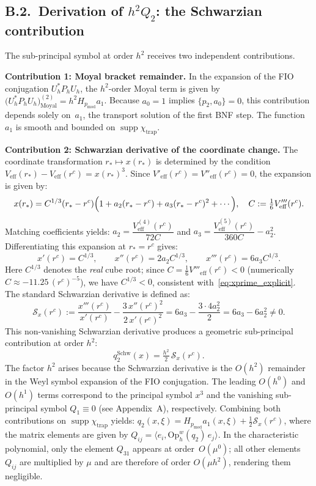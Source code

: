 \documentclass[12pt,a4paper]{amsart}
\theoremstyle{remark}
\begin{document}
\subsection*{B.2.~Derivation of $h^2 Q_2$: the Schwarzian contribution}

The sub-principal symbol at order $h^2$ receives two independent contributions.

\textbf{Contribution 1: Moyal bracket remainder.}
In the expansion of the FIO conjugation $U_h^* P_h U_h$, the $h^2$-order Moyal
term is given by $\bigl(U_h^* P_h U_h\bigr)^{(2)}_{\mathrm{Moyal}} = h^2 H_{p_{\mathrm{mod}}} a_1$.
Because $a_0 = 1$ implies $\{p_2, a_0\} = 0$, this contribution depends solely on~$a_1$, the
transport solution of the first BNF step. The function $a_1$ is smooth and bounded on
$\operatorname{supp}\chi_{\mathrm{trap}}$.

\textbf{Contribution 2: Schwarzian derivative of the coordinate change.}
The coordinate transformation $r_* \mapsto x(r_*)$ is determined by the condition
$V_{\mathrm{eff}}(r_*) - V_{\mathrm{eff}}(r^c) = x(r_*)^3$. Since
$V'_{\mathrm{eff}}(r^c) = V''_{\mathrm{eff}}(r^c) = 0$, the expansion is given by:
\[
  x(r_*) = C^{1/3}(r_* - r^c)\Bigl(1 + a_2(r_*-r^c) + a_3(r_*-r^c)^2 + \cdots\Bigr),
  \quad C := \tfrac{1}{6}V'''_{\mathrm{eff}}(r^c).
\]
Matching coefficients yields:
$a_2 = \dfrac{V^{(4)}_{\mathrm{eff}}(r^c)}{72C}$ and
$a_3 = \dfrac{V^{(5)}_{\mathrm{eff}}(r^c)}{360C} - a_2^2$.
Differentiating this expansion at $r_* = r^c$ gives:
\[
  x'(r^c) = C^{1/3}, \qquad
  x''(r^c) = 2a_2 C^{1/3}, \qquad
  x'''(r^c) = 6a_3 C^{1/3}.
\]
Here $C^{1/3}$ denotes the \emph{real} cube root; since
$C = \tfrac{1}{6}V'''_{\mathrm{eff}}(r^c) < 0$ (numerically $C \approx -11.25\,(r^c)^{-5}$),
we have $C^{1/3} < 0$, consistent with~\eqref{eq:xprime_explicit}.
The standard Schwarzian derivative is defined as:
\[
  \mathcal{S}_x(r^c) := \frac{x'''(r^c)}{x'(r^c)} - \frac{3\,x''(r^c)^2}{2\,x'(r^c)^2}
  = 6a_3 - \frac{3\cdot 4a_2^2}{2}
  = 6a_3 - 6a_2^2 \neq 0.
\]
This non-vanishing Schwarzian derivative produces a geometric sub-principal contribution at order $h^2$:
\[
  q_2^{\mathrm{Schw}}(x) = \tfrac{h^2}{2}\,\mathcal{S}_x(r^c).
\]
The factor $h^2$ arises because the Schwarzian derivative is the $O(h^2)$ remainder in the
Weyl symbol expansion of the FIO conjugation. The leading $O(h^0)$ and $O(h^1)$ terms
correspond to the principal symbol $x^3$ and the vanishing sub-principal symbol $Q_1 \equiv 0$
(see Appendix~A), respectively.
Combining both contributions on $\operatorname{supp}\chi_{\mathrm{trap}}$ yields:
$q_2(x,\xi) = H_{p_{\mathrm{mod}}}a_1(x,\xi) + \tfrac{1}{2}\mathcal{S}_x(r^c)$,
where the matrix elements are given by $Q_{ij} = \langle e_i, \mathrm{Op}^w_h(q_2)\,e_j\rangle$. In the
characteristic polynomial, only the element $Q_{31}$ appears at order~$O(\mu^0)$; all other elements $Q_{ij}$
are multiplied by $\mu$ and are therefore of order $O(\mu h^2)$, rendering them negligible.
\end{document}
